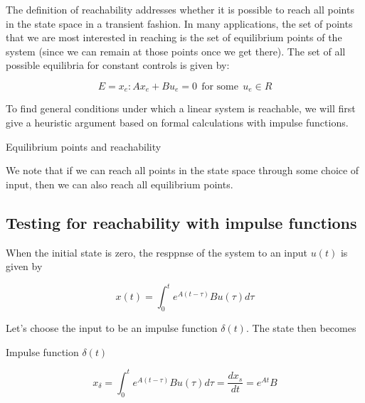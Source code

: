 The definition of reachability addresses whether it is possible to reach all points
in the state space in a transient fashion. In many applications, the set of points that
we are most interested in reaching is the set of equilibrium points of the system
(since we can remain at those points once we get there). The set of all possible
equilibria for constant controls is given by:

\begin{equation}
E = { x_e: Ax_e + Bu_e = 0 ~~ \text{for some} ~~ u_e \in R }
\end{equation}

To find general conditions under which a linear system is reachable, we will
first give a heuristic argument based on formal calculations with impulse functions.

\begin{framed}
\theoremstyle{remark}
\begin{remark}{Equilibrium points and reachability}

We note that if we can reach all points in the state space through some choice of
input, then we can also reach all equilibrium points.
\end{remark}
\end{framed}

\subsection{Testing for reachability with impulse functions}

When the initial state is zero, the resppnse of the system to an input $u(t)$ is given by

\begin{equation}
x(t) = \int_{0}^{t} e^{A(t-\tau)}Bu(\tau)d\tau
\end{equation}

Let's choose the input to be an impulse function $\delta(t)$. The state then becomes

\begin{framed}
\theoremstyle{remark}
\begin{remark}{Impulse function $\delta(t)$}

\end{remark}
\end{framed}

\begin{equation}
x_{\delta}  = \int_{0}^{t} e^{A(t-\tau)}Bu(\tau)d\tau = \frac{dx_s}{dt} = e^{At}B
\end{equation}

